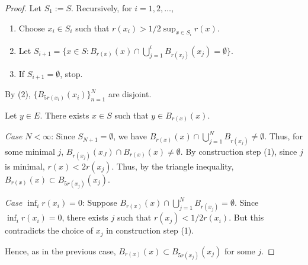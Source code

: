 \documentclass{article}
\begin{document}
\begin{proof}
Let $S_1 := S$. Recursively, for $i = 1, 2, \ldots$,
\begin{enumerate}
\item Choose $x_i \in S_i$ such that $r(x_i) > 1/2 \sup_{x\in S_i} r(x)$.
\item Let $S_{i+1} =  \{x\in S : B_{r(x)}(x) \cap \bigcup_{j=1}^i B_{r(x_j)} (x_j) = \emptyset\}$.
\item If $S_{i+1} = \emptyset$, stop.
\end{enumerate}
By (2), $\{B_{5r(x_i)}(x_i)\}_{n=1}^N$ are disjoint.

Let $y \in E$. There exists $x \in S$ such that $y\in B_{r(x)}(x)$.

\emph{Case $N < \infty$}:  Since $S_{N+1} = \emptyset$, we have $B_{r(x)}(x) \cap \bigcup_{j=1}^N B_{r(x_j)} \ne  \emptyset$. Thus, for some minimal $j$, $B_{r(x_j)}(x_J) \cap B_{r(x)}(x) \ne \emptyset$. By construction step (1), since $j$ is minimal, $r(x) < 2r(x_j)$. Thus, by the triangle inequality, $B_{r(x)}(x) \subset B_{5r(x_j)}(x_j)$.

\emph{Case $\inf_i r(x_i) = 0$}: Suppose $B_{r(x)}(x) \cap \bigcup_{j=1}^N B_{r(x_j)} =  \emptyset$. Since $\inf_i r(x_i) = 0$, there exists $j$ such that $r(x_j) < 1/2 r(x_i)$.  But this contradicts the choice of $x_j$ in construction step (1).

Hence, as in the previous case, $B_{r(x)}(x) \subset B_{5r(x_j)}(x_j)$ for some $j$.

\end{proof}
\end{document}
